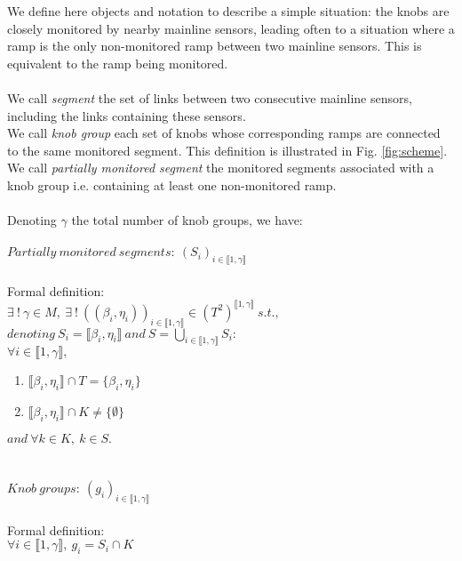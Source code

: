 We define here objects and notation to describe a simple situation: the knobs are closely monitored by nearby mainline sensors, leading often to a situation where a ramp is the only non-monitored ramp between two mainline sensors. This is equivalent to the ramp being monitored.\\
\\
We call \emph{segment} the set of links between two consecutive mainline sensors, including the links containing these sensors. \\
We call \emph{knob group} each set of knobs whose corresponding ramps are connected to the same monitored segment.
This definition is illustrated in Fig. \ref{fig:scheme}.\\
We call \emph{partially monitored segment} the monitored segments associated with a knob group i.e. containing at least one non-monitored ramp.\\
\\
Denoting $\gamma$ the total number of knob groups, we have:\\
\\
$Partially\ monitored\ segments:\ (S_{i})_{i \in \llbracket 1,\gamma \rrbracket}$\\ 
\\
Formal definition:\\
$\exists\ !\ \gamma\in M,\ \exists\ !\ ((\beta_{i},\eta_{i}))_{i\in\llbracket 1,\gamma\rrbracket}\in (T^2)^{\llbracket 1,\gamma\rrbracket}\ s.t.,$\\
$denoting\ S_{i}=\llbracket \beta_{i},\eta_{i} \rrbracket\ and\ S=\underset{i\in \llbracket 1,\gamma \rrbracket}{\bigcup}  S_{i}:$\\
$\forall i\in\llbracket 1,\gamma \rrbracket,$
\begin{enumerate}
	\item $\llbracket \beta_{i},\eta_{i} \rrbracket \cap T=\{\beta_{i},\eta_{i}\}$
	\item $\llbracket \beta_{i}, \eta_{i} \rrbracket \cap K\not= \{\emptyset \}$
\end{enumerate}
$and\ \forall k\in K,\ k\in S.$\\
\\
\\
$Knob\ groups:\ (g_{i})_{i\in \llbracket 1,\gamma \rrbracket}$\\
\\
Formal definition:\\
$\forall i \in \llbracket 1, \gamma \rrbracket,\ g_{i}=S_{i} \cap K $\\
\\
